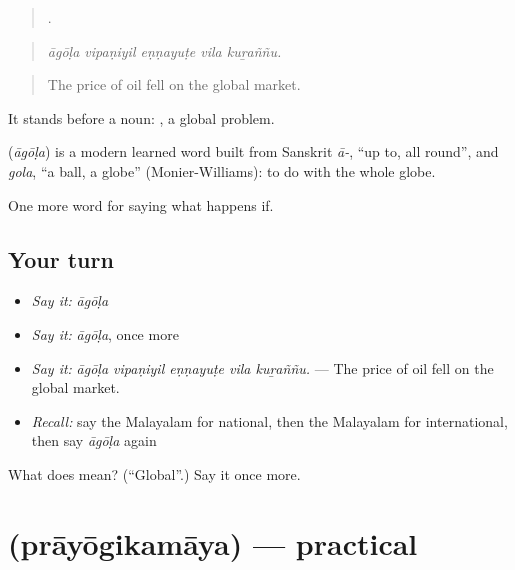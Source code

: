 \begin{quote}
    .
\end{quote}

\begin{quote}
\emph{āgōḷa vipaṇiyil eṇṇayuṭe vila kuṟaññu.}
\end{quote}

\begin{quote}
The price of oil fell on the global market.
\end{quote}

It stands before a noun:  , a global problem.

\begin{cousinweb}
\textbf{} (\emph{āgōḷa}) is a modern learned word built from Sanskrit \emph{ā-}, \textquotedblleft{}up to, all round\textquotedblright{}, and \emph{gola}, \textquotedblleft{}a ball, a globe\textquotedblright{} (Monier-Williams): to do with the whole globe.
\end{cousinweb}

\begin{grammarlens}[title={What you've built}]
One more word for saying what happens if.
\end{grammarlens}

\subsection*{Your turn}
\begin{itemize}
\raggedright
  \item \emph{Say it:} \emph{āgōḷa}
  \item \emph{Say it:} \emph{āgōḷa}, once more
  \item \emph{Say it:} \emph{āgōḷa vipaṇiyil eṇṇayuṭe vila kuṟaññu.} — The price of oil fell on the global market.
  \item \emph{Recall:} say the Malayalam for national, then the Malayalam for international, then say \emph{āgōḷa} again
\end{itemize}

\begin{tcolorbox}[breakable,colback=teal!4,colframe=teal!35!black,title={Before you move on}]
What does  mean? (\textquotedblleft{}Global\textquotedblright{}.) Say it once more.
\end{tcolorbox}
\section[\texorpdfstring{\ml{പ്രായോഗികമായ} (prāyōgikamāya)}{പ്രായോഗികമായ (prāyōgikamāya)}]{ (prāyōgikamāya) — practical}

